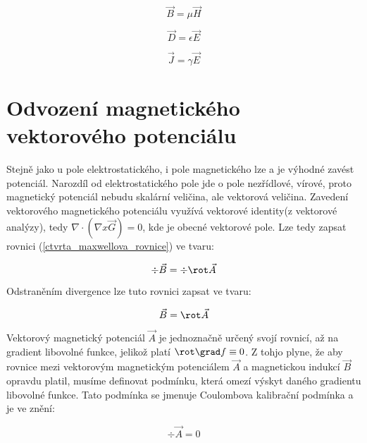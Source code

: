 \begin{equation}
	\vec{B} = \mu \vec{H} 
	\label{permeabilita}
\end{equation}

\begin{equation}
	\vec{D} = \epsilon \vec{E}
	\label{epsilon}
\end{equation}

\begin{equation}
	\vec{J} =  \gamma \vec{E}
	\label{gama}
\end{equation}

\section{Odvození magnetického vektorového potenciálu}
Stejně jako u pole elektrostatického, i pole magnetického lze a je výhodné zavést potenciál. Narozdíl od elektrostatického pole jde o pole nezřídlové, vírové, proto magnetický potenciál nebudu skalární veličina, ale vektorová veličina. Zavedení vektorového magnetického potenciálu využívá vektorové identity(z vektorové analýzy), tedy $\nabla \cdot (\nabla x \vec{G})=0$, kde  je obecné vektorové pole. Lze tedy zapsat rovnici (\ref{ctvrta_maxwellova_rovnice}) ve tvaru:

\begin{equation}
	\div \vec{B} =  \div \rot \vec{A}
	\label{odvozeni_potencial}
\end{equation}

Odstraněním divergence lze tuto rovnici zapsat ve tvaru:

\begin{equation}
	\vec{B} =  \rot \vec{A}
	\label{magneticky_vektorovy_potencial}
\end{equation}

Vektorový magnetický potenciál $\vec{A}$ je jednoznačně určený svojí rovnicí, až na gradient libovolné funkce, jelikož platí $\rot \grad f \equiv 0$. Z tohjo plyne, že aby rovnice mezi vektorovým magnetickým potenciálem $\vec{A}$ a magnetickou indukcí $\vec{B}$ opravdu platil, musíme definovat podmínku, která omezí výskyt daného gradientu libovolné funkce. Tato podmínka se jmenuje Coulombova kalibrační podmínka a je ve znění:

\begin{equation}
	\div \vec{A} =  0
	\label{coulombova_kalibracni_podminka}
\end{equation}